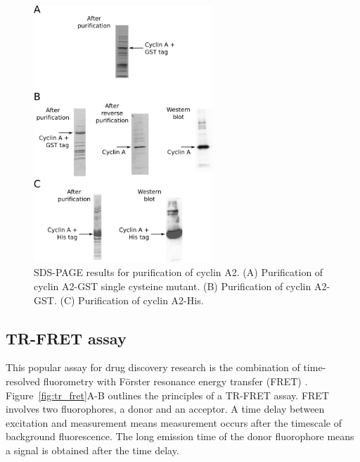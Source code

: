 \begin{figure}
\centering

\includegraphics[width=0.6\textwidth]{figures/purification/purification}

\caption[SDS-PAGE results for purification of cyclin A2]
{SDS-PAGE results for purification of cyclin A2.
(A) Purification of cyclin A2-GST single cysteine mutant.
(B) Purification of cyclin A2-GST.
(C) Purification of cyclin A2-His.}

\label{fig:purification}
\end{figure}


\subsection{TR-FRET assay}

This popular assay for drug discovery research is the combination of time-resolved fluorometry with F\"{o}rster resonance energy transfer (FRET) \cite{Comley2006}.
Figure~\ref{fig:tr_fret}A-B outlines the principles of a TR-FRET assay.
FRET involves two fluorophores, a donor and an acceptor.
A time delay between excitation and measurement means measurement occurs after the timescale of background fluorescence.
The long emission time of the donor fluorophore means a signal is obtained after the time delay.

